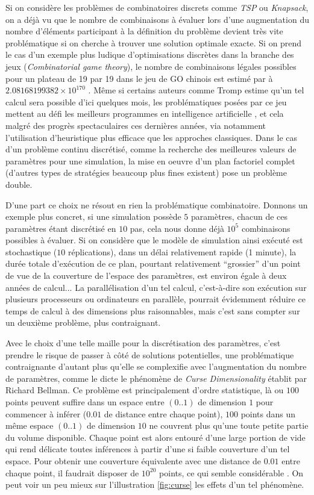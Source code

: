 Si on considère les problèmes de combinatoires discrets comme \textit{TSP} ou \textit{Knapsack}, on a déjà vu que le nombre de combinaisons à évaluer lors d'une augmentation du nombre d'éléments participant à la définition du problème devient très vite problématique si on cherche à trouver une solution optimale exacte. Si on prend le cas d'un exemple plus ludique d'optimisations discrètes dans la branche des jeux (\textit{Combinatorial game theory}), le nombre de combinaisons légales possibles pour un plateau de 19 par 19 dans le jeu de GO chinois est estimé par \textcite{Tromp2007} à $2.08168199382×10^{170}$ . Même si certains auteurs comme Tromp estime qu'un tel calcul sera possible d'ici quelques mois, les problématiques posées par ce jeu mettent au défi les meilleurs programmes en intelligence artificielle \autocite{Bouzi2001}, et cela malgré des progrès spectaculaires ces dernières années, via notamment l'utilisation d'heuristique plus efficace que les approches classiques.  Dans le cas d'un problème continu discrétisé, comme la recherche des meilleures valeurs de paramètres pour une simulation, la mise en oeuvre d'un plan factoriel complet (d'autres types de stratégies beaucoup plus fines existent) pose un problème double.

D'une part ce choix ne résout en rien la problématique combinatoire. Donnons un exemple plus concret, si une simulation possède $5$ paramètres, chacun de ces paramètres étant discrétisé en $10$ pas, cela nous donne déjà $10^5$ combinaisons possibles à évaluer. Si on considère que le modèle de simulation ainsi exécuté est stochastique ($10$ réplications), dans un délai relativement rapide (1 minute), la durée totale d'exécution de ce plan, pourtant relativement \enquote{grossier} d'un point de vue de la couverture de l'espace des paramètres, est environ égale à deux années de calcul... La parallélisation d'un tel calcul, c'est-à-dire son exécution sur plusieurs processeurs ou ordinateurs en parallèle, pourrait évidemment réduire ce temps de calcul à des dimensions plus raisonnables, mais c'est sans compter sur un deuxième problème, plus contraignant.

Avec le choix d'une telle maille pour la discrétisation des paramètres, c'est prendre le risque de passer à côté de solutions potentielles, une problématique contraignante d'autant plus qu'elle se complexifie avec l'augmentation du nombre de paramètres, comme le dicte le phénomène de \textit{Curse Dimensionality} établit par Richard Bellman. Ce problème est principalement d'ordre statistique, là ou $100$ points peuvent suffire dans un espace entre $(0..1)$ de dimension $1$ pour commencer à inférer ($0.01$ de distance entre chaque point), $100$ points dans un même espace $(0..1)$ de dimension $10$ ne couvrent plus qu'une toute petite partie du volume disponible. Chaque point est alors entouré d'une large portion de vide qui rend délicate toutes inférences à partir d'une si faible couverture d'un tel espace. Pour obtenir une couverture équivalente avec une distance de $0.01$ entre chaque point, il faudrait disposer de $10^{20}$ points, ce qui semble considérable \autocite{Bellman1961}. On peut voir un peu mieux sur l'illustration \ref{fig:curse} les effets d'un tel phénomène.

